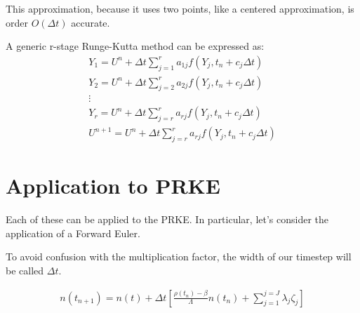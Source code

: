 \documentclass[12pt]{article}
\begin{document}
This approximation, because it uses two points, like a centered approximation, 
is order $O(\Delta t)$ accurate.

A generic r-stage Runge-Kutta method can be expressed as:
\begin{align}
Y_1 = U^n + \Delta t\sum_{j=1}^r a_{1j}f(Y_j, t_n + c_j\Delta t)\\
Y_2 = U^n + \Delta t\sum_{j=2}^r a_{2j}f(Y_j, t_n + c_j\Delta t)\\
\vdots\nonumber\\
Y_r = U^n + \Delta t\sum_{j=r}^r a_{rj}f(Y_j, t_n + c_j\Delta t)\\
U^{n+1} = U^n + \Delta t\sum_{j=r}^r a_{rj}f(Y_j, t_n + c_j\Delta t)
\end{align}



\section{Application to PRKE}

Each of these can be applied to the PRKE. In particular, let's consider the 
application of a Forward Euler.

To avoid confusion with the multiplication factor, the width of our timestep will be called $\Delta t$.

\begin{align}
n(t_{n+1}) = n(t) + \Delta t\left[\frac{\rho(t_n)-\beta}{\Lambda}n(t_n) + \displaystyle\sum^{j=J}_{j=1}\lambda_j\zeta_j\right]\\
\end{align}
\end{document}
